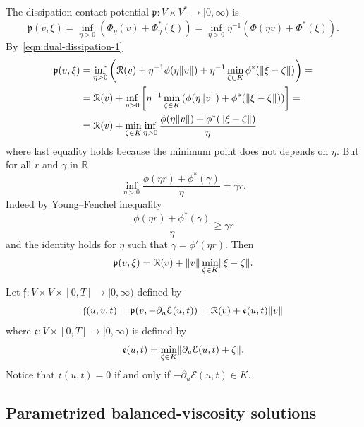 \documentclass[letterpaper,oneside]{amsart}
\numberwithin{equation}{section}
\theoremstyle{definition}
\DeclarePairedDelimiter{\norm}{\lVert}{\rVert}
\begin{document}
The dissipation contact potential $\mathfrak{p}\colon V\times V^*\to[0,\infty)$ is
\begin{equation*}
\mathfrak{p}(v,\xi)=\inf_{\eta>0}\left(\Phi_\eta(v)+\Phi_\eta^*(\xi)\right)=\inf_{\eta>0}\eta^{-1}\left(\Phi(\eta v)+\Phi^*(\xi)\right).
\end{equation*}
By~\eqref{eqn:dual-dissipation-1}
\begin{equation*}
\begin{split}
\mathfrak{p}(v,\xi)&=\inf_{\eta>0}\left(\mathcal{R}(v)+\eta^{-1}\phi(\eta\norm{v})+\eta^{-1}\min_{\zeta\in K}\phi^*(\norm{\xi-\zeta})\right)=\\
&=\mathcal{R}(v)+\inf_{\eta>0}\left[\eta^{-1}\min_{\zeta\in K}\left(\phi(\eta\norm{v})+\phi^*(\norm{\xi-\zeta})\right)\right]=\\
&=\mathcal{R}(v)+\min_{\zeta\in K}\inf_{\eta>0}\frac{\phi(\eta\norm{v})+\phi^*(\norm{\xi-\zeta})}{\eta}
\end{split}
\end{equation*}
where last equality holds because the minimum point does not depends on $\eta$. But for all $r$ and $\gamma$ in $\mathbb{R}$
\begin{equation*}
\inf_{\eta>0}\frac{\phi(\eta r)+\phi^*(\gamma)}{\eta}=\gamma r.
\end{equation*}
Indeed by Young--Fenchel inequality
\begin{equation*}
\frac{\phi(\eta r)+\phi^*(\gamma)}{\eta}\ge\gamma r
\end{equation*}
and the identity holds for $\eta$ such that $\gamma=\phi'(\eta r)$. Then
\begin{equation}
\label{eqn:contact-dissipation-potantial-split}
\mathfrak{p}(v,\xi)=\mathcal{R}(v)+\norm{v}\min_{\zeta\in K}\norm{\xi-\zeta}.
\end{equation}

Let $\mathfrak{f}\colon V\times V\times[0,T]\to[0,\infty)$ defined by
\begin{equation}
\mathfrak{f}(u,v,t)=\mathfrak{p}(v,-\partial_u\mathcal{E}(u,t))=\mathcal{R}(v)+\mathfrak{e}(u,t)\norm{v}
\end{equation}
where $\mathfrak{e}\colon V\times[0,T]\to[0,\infty)$ is defined by
\[
\mathfrak{e}(u,t)=\min_{\zeta\in K}\norm{\partial_u\mathcal{E}(u,t)+\zeta}.
\]
Notice that $\mathfrak{e}(u,t)=0$ if and only if $-\partial_u\mathcal{E}(u,t)\in K$.

\subsection{Parametrized balanced-viscosity solutions}
\end{document}
